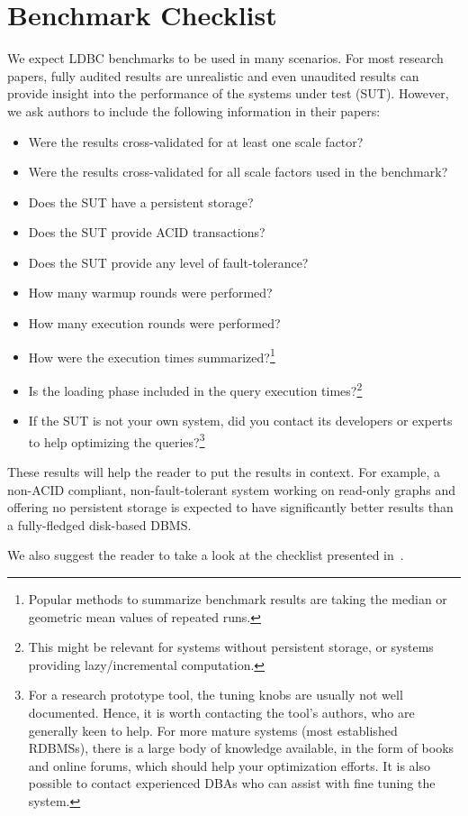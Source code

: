 \chapter{Benchmark Checklist}
\label{sec:benchmark-checklist}

We expect LDBC benchmarks to be used in many scenarios.
For most research papers, fully audited results are unrealistic and even unaudited results can provide insight into the performance of the systems under test (SUT). However, we ask authors to include the following information in their papers:

\begin{itemize}
\item Were the results cross-validated for at least one scale factor?
\item Were the results cross-validated for all scale factors used in the benchmark?
\item Does the SUT have a persistent storage?
\item Does the SUT provide ACID transactions?
\item Does the SUT provide any level of fault-tolerance?
\item How many warmup rounds were performed?
\item How many execution rounds were performed?
\item How were the execution times summarized?\footnote{Popular methods to summarize benchmark results are taking the median or geometric mean values of repeated runs.}
\item Is the loading phase included in the query execution times?\footnote{This might be relevant for systems without persistent storage, or systems providing lazy/incremental computation.}
\item If the SUT is not your own system, did you contact its developers or experts to help optimizing the queries?\footnote{For a research prototype tool, the tuning knobs are usually not well documented. Hence, it is worth contacting the tool's authors, who are generally keen to help. For more mature systems (\eg most established RDBMSs), there is a large body of knowledge available, in the form of books and online forums, which should help your optimization efforts. It is also possible to contact experienced DBAs who can assist with fine tuning the system.}
\end{itemize}

These results will help the reader to put the results in context. For example, a non-ACID compliant, non-fault-tolerant system working on read-only graphs and offering no persistent storage is expected to have significantly better results than a fully-fledged disk-based DBMS.

We also suggest the reader to take a look at the checklist presented in~\cite{DBLP:conf/sigmod/RaasveldtHGM18}.
